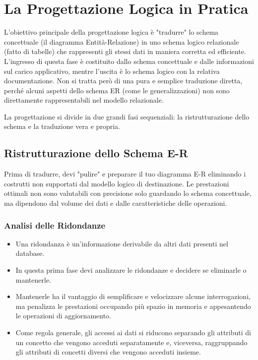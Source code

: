 \chapter{La Progettazione Logica in Pratica}

L'obiettivo principale della progettazione logica è "tradurre" lo schema concettuale (il diagramma Entità-Relazione) in uno schema logico relazionale (fatto di tabelle) che rappresenti gli stessi dati in maniera corretta ed efficiente. L'ingresso di questa fase è costituito dallo schema concettuale e dalle informazioni sul carico applicativo, mentre l'uscita è lo schema logico con la relativa documentazione. Non si tratta però di una pura e semplice traduzione diretta, perché alcuni aspetti dello schema ER (come le generalizzazioni) non sono direttamente rappresentabili nel modello relazionale.

La progettazione si divide in due grandi fasi sequenziali: la ristrutturazione dello schema e la traduzione vera e propria.

\section{Ristrutturazione dello Schema E-R}
Prima di tradurre, devi "pulire" e preparare il tuo diagramma E-R eliminando i costrutti non supportati dal modello logico di destinazione. Le prestazioni ottimali non sono valutabili con precisione solo guardando lo schema concettuale, ma dipendono dal volume dei dati e dalle caratteristiche delle operazioni.

\subsection{Analisi delle Ridondanze}
\begin{itemize}
    \item Una ridondanza è un'informazione derivabile da altri dati presenti nel database.
    \item In questa prima fase devi analizzare le ridondanze e decidere se eliminarle o mantenerle.
    \item Mantenerle ha il vantaggio di semplificare e velocizzare alcune interrogazioni, ma penalizza le prestazioni occupando più spazio in memoria e appesantendo le operazioni di aggiornamento.
    \item Come regola generale, gli accessi ai dati si riducono separando gli attributi di un concetto che vengono acceduti separatamente e, viceversa, raggruppando gli attributi di concetti diversi che vengono acceduti insieme.
\end{itemize}

